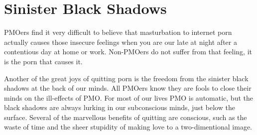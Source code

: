 \documentclass[easypeasy.tex]{subfiles}
\begin{document}
\section{Sinister Black Shadows}

PMOers find it very difficult to believe that masturbation to internet porn actually causes those insecure feelings when you are our late at night after a contentious day at home or work. Non-PMOers do not suffer from that feeling, it is the porn that causes it.

Another of the great joys of quitting porn is the freedom from the sinister black shadows at the back of our minds. All PMOers know they are fools to close their minds on the ill-effects of PMO. For most of our lives PMO is automatic, but the black shadows are always lurking in our subconscious minds, just below the surface. Several of the marvellous benefits of quitting are conscious, such as the waste of time and the sheer stupidity of making love to a two-dimentional image. 
\end{document}
